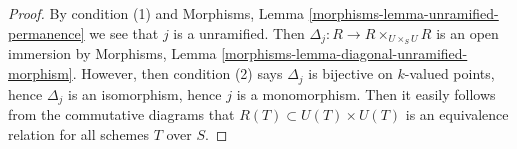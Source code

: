 \documentclass{stacks-project}
\theoremstyle{plain}
\theoremstyle{definition}
\theoremstyle{remark}
\numberwithin{equation}{subsection}
\begin{document}
\begin{proof}
By condition (1) and
Morphisms, Lemma \ref{morphisms-lemma-unramified-permanence}
we see that $j$ is a unramified. Then
$\Delta_j : R \to R \times_{U \times_S U} R$ is an open immersion by
Morphisms, Lemma \ref{morphisms-lemma-diagonal-unramified-morphism}.
However, then condition (2) says $\Delta_j$ is bijective on
$k$-valued points, hence $\Delta_j$ is an isomorphism, hence $j$
is a monomorphism. Then it easily follows from the commutative
diagrams that $R(T) \subset U(T) \times U(T)$ is an equivalence
relation for all schemes $T$ over $S$.
\end{proof}
\end{document}
